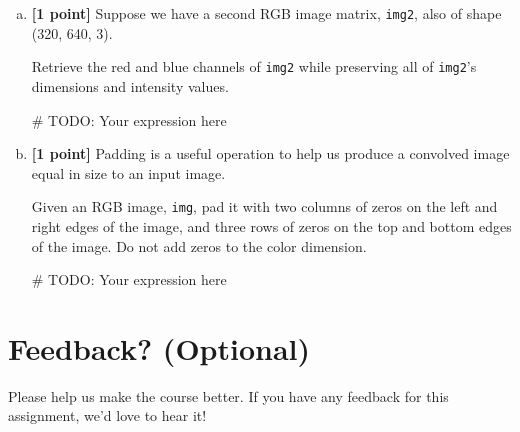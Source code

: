 \documentclass[11pt]{article}
\begin{document}
\begin{enumerate}[(a)]
    \pagebreak
    \item \textbf{[1 point]} Suppose we have a second RGB image matrix, \texttt{img2}, also of shape (320, 640, 3).
    
    \begin{tcolorbox}[colback=orange!5!white,colframe=orange!75!black]
    Retrieve the red and blue channels of \texttt{img2} while preserving all of \texttt{img2}'s dimensions and intensity values.
    \end{tcolorbox}
    
    \begin{tcolorbox}[colback=white!5!white,colframe=green!75!black,height=2cm]
    \begin{python}
    # TODO: Your expression here
    \end{python}
    \end{tcolorbox}
    
    \item \textbf{[1 point]} Padding is a useful operation to help us produce a convolved image equal in size to an input image. 
    
    \begin{tcolorbox}[colback=orange!5!white,colframe=orange!75!black]
    Given an RGB image, \texttt{img}, pad it with two columns of zeros on the left and right edges of the image, and three rows of zeros on the top and bottom edges of the image. Do not add zeros to the color dimension.
    \end{tcolorbox}
    
    \begin{tcolorbox}[colback=white!5!white,colframe=green!75!black,height=2cm]
    \begin{python}
    # TODO: Your expression here
    \end{python}
    \end{tcolorbox}
    
\end{enumerate}


\pagebreak
\section*{Feedback? (Optional)}
Please help us make the course better. If you have any feedback for this assignment, we'd love to hear it!
\end{document}
